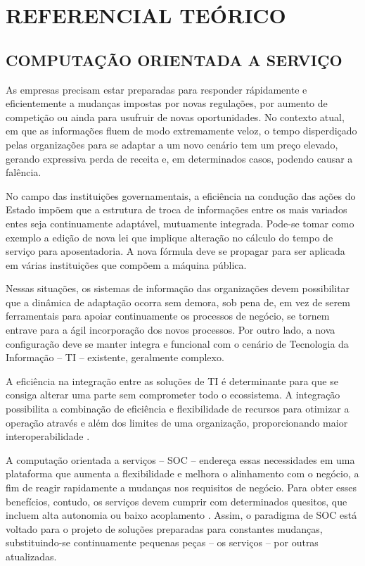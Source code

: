  
\chapter{REFERENCIAL TEÓRICO}
\vspace{-6mm}

\section{COMPUTAÇÃO ORIENTADA A SERVIÇO}
\vspace{-6mm}


As empresas precisam estar preparadas para responder rápidamente e
eficientemente a mudanças impostas por novas regulações, por aumento de
competição ou ainda para usufruir de novas oportunidades. No contexto atual, em que as
informações fluem de modo extremamente veloz, o tempo disperdiçado pelas organizações para se
adaptar a um novo cenário tem um preço elevado, gerando expressiva perda de
receita e, em determinados casos, podendo causar a falência.

No campo das instituições governamentais, a eficiência na condução das ações do
Estado impõem que a estrutura de troca de informações entre os mais variados
entes seja continuamente adaptável, mutuamente integrada. Pode-se tomar como
exemplo a edição de nova lei que implique alteração no cálculo do tempo de
serviço para aposentadoria. A nova fórmula deve se propagar para ser
aplicada em várias instituições que compõem a máquina pública.

Nessas situações, os sistemas de informação das organizações devem possibilitar
que a dinâmica de adaptação ocorra sem demora, sob pena de, em vez de serem
ferramentais para apoiar continuamente os processos de negócio, se tornem
entrave para a ágil incorporação dos novos processos. Por outro lado, a nova
configuração deve se manter integra e funcional com o cenário de Tecnologia da
Informação -- TI -- existente, geralmente complexo.

A eficiência na integração entre as soluções de TI é determinante para que se
consiga alterar uma parte sem comprometer todo o ecossistema. A integração
possibilita a combinação de eficiência e flexibilidade de recursos para otimizar
a operação através e além dos limites de uma organização, proporcionando maior
interoperabilidade \cite{papazoglou2008service}.

A computação orientada a serviços -- SOC -- endereça essas necessidades em uma
plataforma que aumenta a flexibilidade e melhora o alinhamento com o negócio, a
fim de reagir rapidamente a mudanças nos requisitos de negócio. Para obter esses
benefícios, contudo, os serviços devem cumprir com determinados quesitos, que
incluem alta autonomia ou baixo acoplamento \cite{erl2008soa}. Assim, o paradigma de SOC
está voltado para o projeto de soluções preparadas para constantes mudanças,
substituindo-se continuamente pequenas peças -- os serviços -- por outras
atualizadas.

